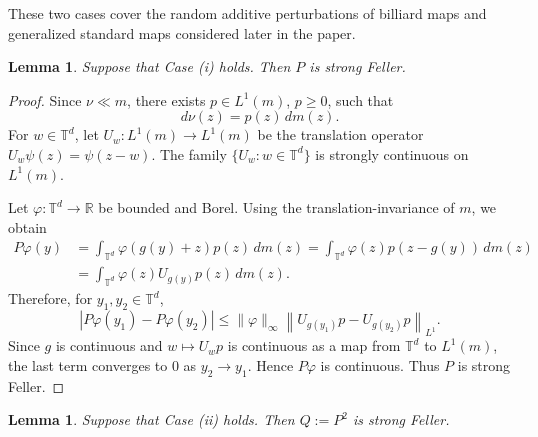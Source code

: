 \documentclass[a4paper,12pt,reqno]{amsart}
\numberwithin{equation}{section}
\newtheorem{lemma}[theorem]{Lemma}
\newcommand{\Rr}{{\mathbb{R}}}
\newcommand{\Tt}{{\mathbb{T}}}
\begin{document}
These two cases cover the random additive perturbations of billiard maps and generalized standard maps considered later in the paper.

\begin{lemma}
\label{lem:strong-feller-ac}
Suppose that Case (i) holds. Then $P$ is strong Feller.
\end{lemma}

\begin{proof}
Since $\nu\ll m$, there exists $p\in L^1(m)$, $p\geq 0$, such that
\[
d\nu(z)=p(z)\,dm(z).
\]
For $w\in\Tt^d$, let $U_w\colon L^1(m)\to L^1(m)$ be the translation operator
$U_w\psi(z)=\psi(z-w)$. The family $\{U_w:w\in\Tt^d\}$ is strongly continuous on $L^1(m)$.

Let $\varphi\colon\Tt^d\to\Rr$ be bounded and Borel. Using the translation-invariance of $m$, we obtain
\[
\begin{aligned}
P\varphi(y)
&=
\int_{\Tt^d}\varphi(g(y)+z)p(z)\,dm(z) =
\int_{\Tt^d}\varphi(z)p(z-g(y))\,dm(z)  \\
&=
\int_{\Tt^d}\varphi(z)U_{g(y)}p(z)\,dm(z).
\end{aligned}
\]
Therefore, for $y_1,y_2\in\Tt^d$,
\[
\left|P\varphi(y_1)-P\varphi(y_2)\right|
\leq
\|\varphi\|_\infty
\left\|U_{g(y_1)}p-U_{g(y_2)}p\right\|_{L^1}.
\]
Since $g$ is continuous and $w\mapsto U_w p$ is continuous as a map from $\Tt^d$ to $L^1(m)$, the last term converges to $0$ as $y_2\to y_1$. Hence $P\varphi$ is continuous. Thus $P$ is strong Feller.
\end{proof}

\begin{lemma}
\label{lem:strong-feller-singular}
Suppose that Case (ii) holds. Then $Q:=P^2$ is strong Feller.
\end{lemma}
\end{document}
